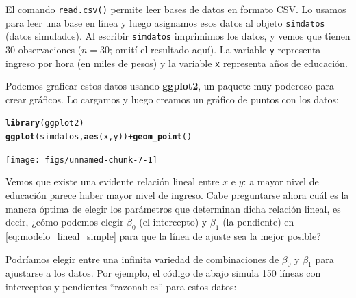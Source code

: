 \documentclass{article}\usepackage[]{graphicx}\usepackage[]{color}
\makeatletter
\newcommand{\hlopt}[1]{\textcolor[rgb]{0,0,0}{#1}}%
\newcommand{\hlstd}[1]{\textcolor[rgb]{0.345,0.345,0.345}{#1}}%
\newcommand{\hlkwd}[1]{\textcolor[rgb]{0.737,0.353,0.396}{\textbf{#1}}}%
\newenvironment{kframe}{%
 \def\at@end@of@kframe{}%
 \ifinner\ifhmode%
  \def\at@end@of@kframe{\end{minipage}}%
  \begin{minipage}{\columnwidth}%
 \fi\fi%
 \def\FrameCommand##1{\hskip\@totalleftmargin \hskip-\fboxsep
 \colorbox{shadecolor}{##1}\hskip-\fboxsep
     \hskip-\linewidth \hskip-\@totalleftmargin \hskip\columnwidth}%
 \MakeFramed {\advance\hsize-\width
   \@totalleftmargin\z@ \linewidth\hsize
   \@setminipage}}%
 {\par\unskip\endMakeFramed%
 \at@end@of@kframe}
\newenvironment{knitrout}{}{} %
\newcommand*{\paq}[1]{\textbf{#1}}
\makeatother
\begin{document}
El comando \verb|read.csv()| permite leer bases de datos en formato CSV. Lo usamos para leer una base en línea y luego asignamos esos datos al objeto \verb|simdatos| (datos simulados). Al escribir \verb|simdatos| imprimimos los datos, y vemos que tienen 30 observaciones ($n=30$; omití el resultado aquí). La variable \verb|y| representa ingreso por hora (en miles de pesos) y la variable \verb|x| representa años de educación.

Podemos graficar estos datos usando \paq{ggplot2}, un paquete muy poderoso para crear gráficos. Lo cargamos y luego creamos un gráfico de puntos con los datos:

\begin{knitrout}
\color{fgcolor}\begin{kframe}
\begin{alltt}
\hlkwd{library}\hlstd{(ggplot2)}
\hlkwd{ggplot}\hlstd{(simdatos,} \hlkwd{aes}\hlstd{(x, y))} \hlopt{+} \hlkwd{geom_point}\hlstd{()}
\end{alltt}
\end{kframe}

{\centering \texttt{[image: figs/unnamed-chunk-7-1]} 

}



\end{knitrout}

Vemos que existe una evidente relación lineal entre $x$ e $y$: a mayor nivel de educación parece haber mayor nivel de ingreso. Cabe preguntarse ahora cuál es la manera óptima de elegir los parámetros que determinan dicha relación lineal, es decir, ¿cómo podemos elegir $\beta_0$ (el intercepto) y $\beta_1$ (la pendiente) en \eqref{eq:modelo_lineal_simple} para que la línea de ajuste sea la mejor posible?

Podríamos elegir entre una infinita variedad de combinaciones de $\beta_0$ y $\beta_1$ para ajustarse a los datos. Por ejemplo, el código de abajo simula 150 líneas con interceptos y pendientes ``razonables'' para estos datos:
\end{document}
